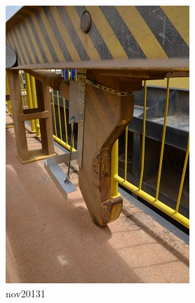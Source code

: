 \begin{figure}[h!]
\centering
  \includegraphics[width=1\linewidth]{Fotos/Novembro2014/1.jpg}
  \caption{nov20131}
  \label{nov20131}
\end{figure}

